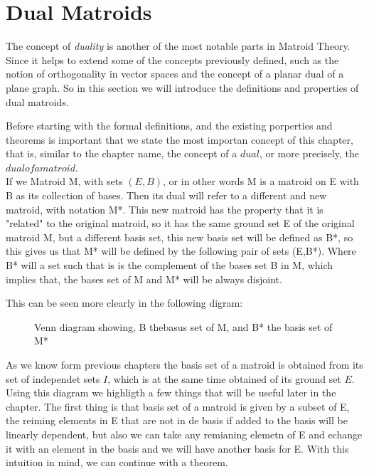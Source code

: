 \section{Dual Matroids}
The concept of \textit{duality} is another of the most notable parts in Matroid Theory. Since it helps to extend some of the concepts previously defined, such as the notion of orthogonality in vector spaces and the concept of a planar dual of a plane graph. So in this section we will introduce the definitions and  properties of dual matroids.

Before starting with the formal definitions, and the existing porperties and theorems is important that we state the most importan concept of this chapter, that is, similar to the chapter name, the concept of a $dual$, or more precisely, the $dual of a matroid$.\\

If we Matroid M, with sets $(E,B)$, or in other words M is a matroid on E with B as its collection of bases. Then its dual will refer to a different and new matroid, with notation M*. This new matroid has the property that it is "related" to the original matroid, so it has the same ground set E of the original matroid M, but a different basis set, this new basis set will be defined as B*, so this gives us that M* will be defined by the following pair of sets (E,B*). Where B* will a set such that is is the complement of the bases set B in M, which implies that, the bases set of M and M* will be always disjoint.

This can be seen more clearly in the following digram:
\begin{figure}[H]
    \centering
{}
\caption{Venn diagram showing, B thebasus set of M, and B* the basis set of M*}%
\label{graphic}%
\end{figure}

As we know form previous chapters the basis set of a matroid is obtained from its set of independet sets $I$, which is at the same time obtained of its ground set $E$.
Using this diagram we highligth a few things that will be useful later in the chapter.
The first thing is that basis set of a matroid is given by a subset of E, the reiming elements in E that are not in de basis if added to the basis will be linearly dependent, but also we can take any remianing elemetn of E and echange it with an element in the basis and we will have another basis for E. With this intuition in mind, we can continue with a theorem.

